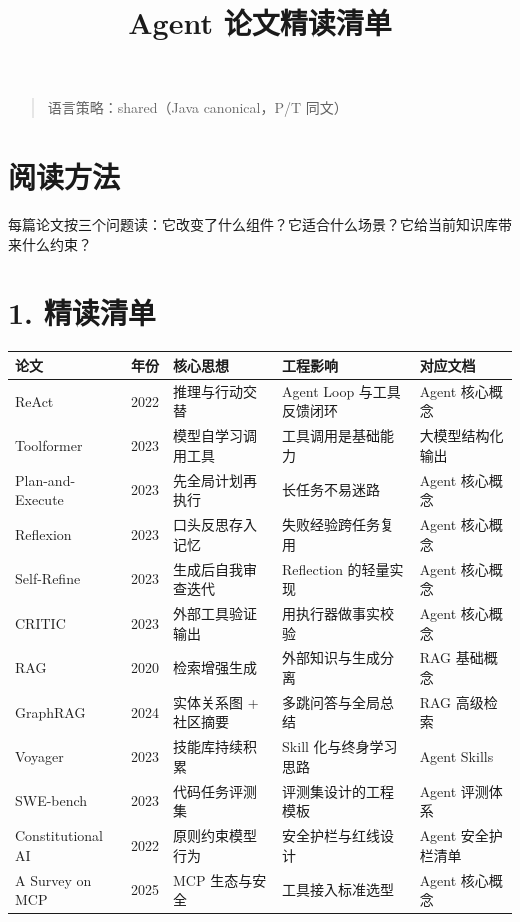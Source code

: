 \documentclass[9pt,a4paper,twocolumn]{ctexart}
\begin{document}
\title{Agent 论文精读清单}
\date{}
\maketitle
{}

\begin{quote}
语言策略：shared（Java canonical，P/T 同文）
\end{quote}



\section*{阅读方法}


每篇论文按三个问题读：它改变了什么组件？它适合什么场景？它给当前知识库带来什么约束？



\section*{1. 精读清单}

{\footnotesize
\begin{tabular}{|p{}|p{}|p{}|p{}|p{}|}
\hline
\textbf{论文} & \textbf{年份} & \textbf{核心思想} & \textbf{工程影响} & \textbf{对应文档} \\
\hline
ReAct & 2022 & 推理与行动交替 & Agent Loop 与工具反馈闭环 & Agent 核心概念 \\
\hline
Toolformer & 2023 & 模型自学习调用工具 & 工具调用是基础能力 & 大模型结构化输出 \\
\hline
Plan-and-Execute & 2023 & 先全局计划再执行 & 长任务不易迷路 & Agent 核心概念 \\
\hline
Reflexion & 2023 & 口头反思存入记忆 & 失败经验跨任务复用 & Agent 核心概念 \\
\hline
Self-Refine & 2023 & 生成后自我审查迭代 & Reflection 的轻量实现 & Agent 核心概念 \\
\hline
CRITIC & 2023 & 外部工具验证输出 & 用执行器做事实校验 & Agent 核心概念 \\
\hline
RAG & 2020 & 检索增强生成 & 外部知识与生成分离 & RAG 基础概念 \\
\hline
GraphRAG & 2024 & 实体关系图 + 社区摘要 & 多跳问答与全局总结 & RAG 高级检索 \\
\hline
Voyager & 2023 & 技能库持续积累 & Skill 化与终身学习思路 & Agent Skills \\
\hline
SWE-bench & 2023 & 代码任务评测集 & 评测集设计的工程模板 & Agent 评测体系 \\
\hline
Constitutional AI & 2022 & 原则约束模型行为 & 安全护栏与红线设计 & Agent 安全护栏清单 \\
\hline
A Survey on MCP & 2025 & MCP 生态与安全 & 工具接入标准选型 & Agent 核心概念 \\
\hline
\end{tabular}
}
\end{document}
